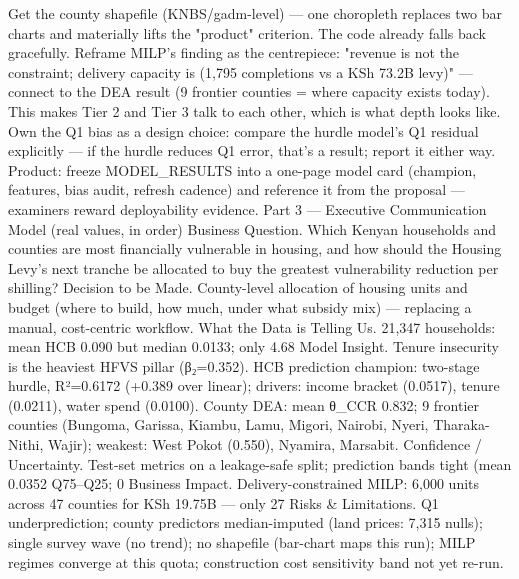 Get the county shapefile (KNBS/gadm-level) — one choropleth replaces two bar charts and materially lifts the "product" criterion. The code already falls back gracefully.
Reframe MILP's finding as the centrepiece: "revenue is not the constraint; delivery capacity is (1,795 completions vs a KSh 73.2B levy)" — connect to the DEA result (9 frontier counties = where capacity exists today). This makes Tier 2 and Tier 3 talk to each other, which is what depth looks like.
Own the Q1 bias as a design choice: compare the hurdle model's Q1 residual explicitly — if the hurdle reduces Q1 error, that's a result; report it either way.
Product: freeze MODEL_RESULTS into a one-page model card (champion, features, bias audit, refresh cadence) and reference it from the proposal — examiners reward deployability evidence.
Part 3 — Executive Communication Model (real values, in order)
Business Question. Which Kenyan households and counties are most financially vulnerable in housing, and how should the Housing Levy's next tranche be allocated to buy the greatest vulnerability reduction per shilling?
Decision to be Made. County-level allocation of housing units and budget (where to build, how much, under what subsidy mix) — replacing a manual, cost-centric workflow.
What the Data is Telling Us. 21,347 households: mean HCB 0.090 but median 0.0133; only 4.68%
Model Insight. Tenure insecurity is the heaviest HFVS pillar (β₂=0.352). HCB prediction champion: two-stage hurdle, R²=0.6172 (+0.389 over linear); drivers: income bracket (0.0517), tenure (0.0211), water spend (0.0100). County DEA: mean θ_CCR 0.832; 9 frontier counties (Bungoma, Garissa, Kiambu, Lamu, Migori, Nairobi, Nyeri, Tharaka-Nithi, Wajir); weakest: West Pokot (0.550), Nyamira, Marsabit.
Confidence / Uncertainty. Test-set metrics on a leakage-safe split; prediction bands tight (mean 0.0352 Q75–Q25; 0%
Business Impact. Delivery-constrained MILP: 6,000 units across 47 counties for KSh 19.75B — only 27%
Risks & Limitations. Q1 underprediction; county predictors median-imputed (land prices: 7,315 nulls); single survey wave (no trend); no shapefile (bar-chart maps this run); MILP regimes converge at this quota; construction cost sensitivity band not yet re-run.
